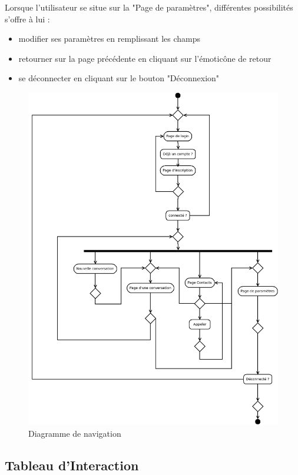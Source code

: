 	Lorsque l'utilisateur se situe sur la "Page de paramètres", différentes possibilités s'offre à lui :
	\begin{itemize}
		\item modifier ses paramètres en remplissant les champs
		\item retourner sur la page précédente en cliquant sur l’émoticône de retour
		\item se déconnecter en cliquant sur le bouton "Déconnexion"\\
	\end{itemize}

	\begin{figure}[H]
		\centerline{\includegraphics[width=16.5cm]{img/navigation.png}}
		\caption{Diagramme de navigation}
	\end{figure}


	\subsection{Tableau d’Interaction}

